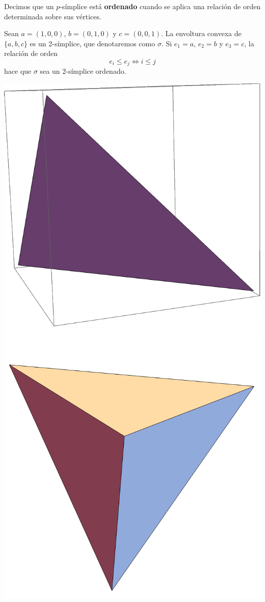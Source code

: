 Decimos que un $p$-símplice está \textbf{ordenado} cuando se aplica una relación
de orden determinada sobre sus vértices.

\begin{ejem}
Sean $a=(1,0,0)$, $b=(0,1,0)$ y $c=(0,0,1)$. La envoltura convexa de $\{a,b,c\}$
es un 2-símplice, que denotaremos como $\sigma$. Si $e_1=a$, $e_2=b$ y $e_3=c$,
la relación de orden
\[e_i \leq e_j \iff i \leq j\]
hace que $\sigma$ sea un 2-símplice ordenado.
\end{ejem}

\begin{marginfigure}
\centering
\includegraphics{Figures/2Simplice.pdf}
\includegraphics{Figures/Simplice.pdf}

\end{marginfigure}
